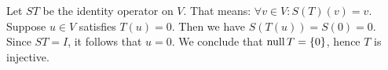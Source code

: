 \begin{xrcs}
\begin{prf}
    \Leftarrowdirection Let $ST$ be the identity operator on $V$. That means: $\forall v \in V: S(T)(v) = v$. Suppose $u \in V$ satisfies $T(u) = 0$. Then we have $S(T(u)) = S(0) = 0$. Since $ST = I$, it follows that $u = 0$. We conclude that $\operatorname{null} T = \{0\}$, hence $T$ is injective.
  \end{prf}
%
%
%
%
\end{xrcs}


